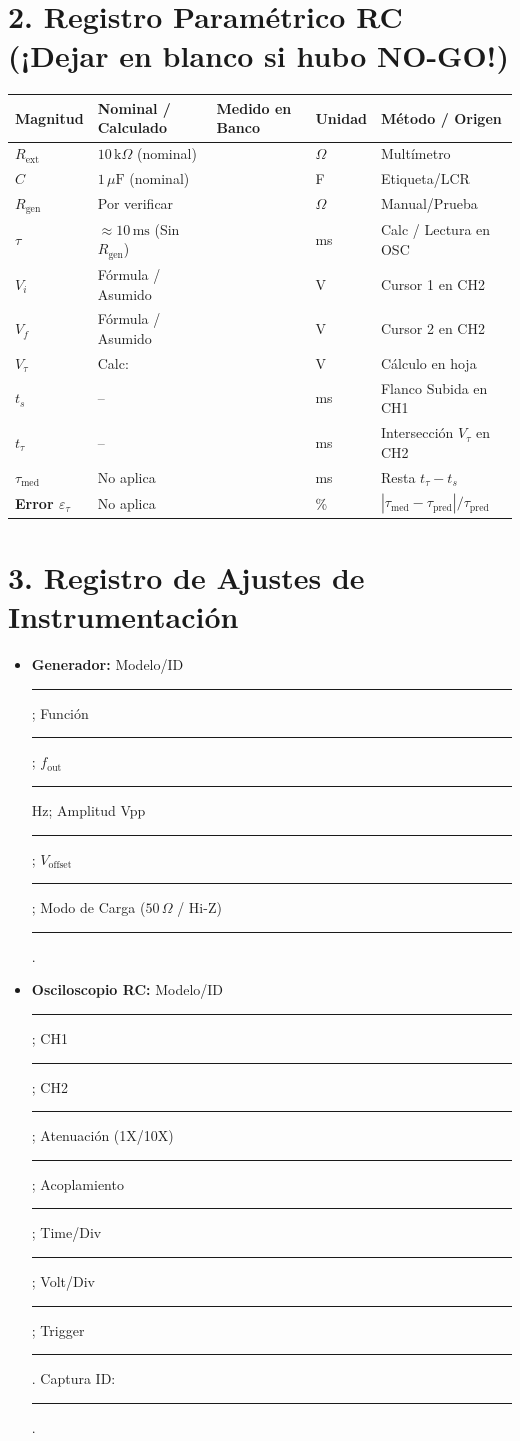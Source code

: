 \documentclass[11pt, a4paper]{article}
\begin{document}
\section*{2. Registro Paramétrico RC (¡Dejar en blanco si hubo NO-GO!)}
\renewcommand{\arraystretch}{1.4}
\noindent
\begin{tabularx}{\textwidth}{
  >{\bfseries\RaggedRight\hsize=0.8\hsize}X 
  >{\RaggedRight\arraybackslash\hsize=1.2\hsize}X 
  >{\RaggedRight\arraybackslash\hsize=1.0\hsize}X 
  >{\centering\arraybackslash\hsize=0.8\hsize}X 
  >{\RaggedRight\arraybackslash\hsize=1.2\hsize}X}
\toprule
\textbf{Magnitud} & \textbf{Nominal / Calculado} & \textbf{Medido en Banco} & \textbf{Unidad} & \textbf{Método / Origen} \\
\midrule
$R_{\text{ext}}$ & $10\,\text{k}\Omega$ (nominal) & & $\Omega$ & Multímetro \\
$C$ & $1\,\mu\text{F}$ (nominal) & & F & Etiqueta/LCR \\
$R_{\text{gen}}$ & Por verificar & & $\Omega$ & Manual/Prueba \\
$\tau$ & $\approx 10\,\text{ms}$ (Sin $R_{\text{gen}}$) & & ms & Calc / Lectura en OSC \\
$V_i$ & Fórmula / Asumido & & V & Cursor 1 en CH2 \\
$V_f$ & Fórmula / Asumido & & V & Cursor 2 en CH2 \\
$V_{\tau}$ & Calc: & & V & Cálculo en hoja \\
$t_s$ & -- & & ms & Flanco Subida en CH1 \\
$t_{\tau}$ & -- & & ms & Intersección $V_{\tau}$ en CH2 \\
$\tau_{\text{med}}$ & No aplica & & ms & Resta $t_{\tau} - t_s$ \\
Error $\varepsilon_{\tau}$ & No aplica & & \% & $| \tau_{\text{med}} - \tau_{\text{pred}} | / \tau_{\text{pred}}$ \\
\bottomrule
\end{tabularx}

\section*{3. Registro de Ajustes de Instrumentación}
\begin{itemize}\setlength\itemsep{0.1cm}
    \item \textbf{Generador:} Modelo/ID \rule{2cm}{0.4pt}; Función \rule{1.5cm}{0.4pt}; $f_{\text{out}}$ \rule{1.5cm}{0.4pt} Hz; Amplitud Vpp \rule{1.5cm}{0.4pt}; $V_{\text{offset}}$ \rule{1.5cm}{0.4pt}; Modo de Carga ($50\,\Omega$ / Hi-Z) \rule{1.5cm}{0.4pt}.
    \item \textbf{Osciloscopio RC:} Modelo/ID \rule{2cm}{0.4pt}; CH1 \rule{1.5cm}{0.4pt}; CH2 \rule{1.5cm}{0.4pt}; Atenuación (1X/10X) \rule{1cm}{0.4pt}; Acoplamiento \rule{1cm}{0.4pt}; Time/Div \rule{1.5cm}{0.4pt}; Volt/Div \rule{1.5cm}{0.4pt}; Trigger \rule{2cm}{0.4pt}. Captura ID: \rule{2cm}{0.4pt}.
\end{itemize}
\end{document}
